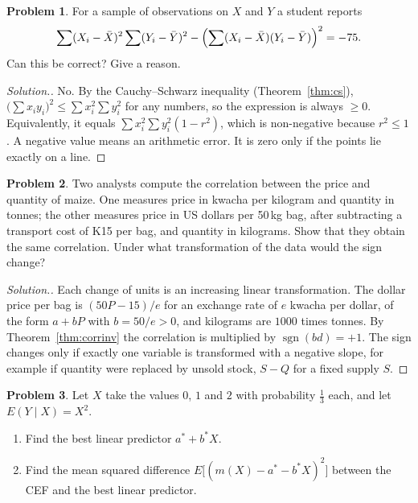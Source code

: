 \documentclass[11pt,a4paper]{article}
\numberwithin{equation}{section}
\theoremstyle{definition}
\newtheorem{problemx}{Problem}[subsection]
\newenvironment{problem}{\begin{problemx}}{\end{problemx}}
\newenvironment{solution}
  {\renewcommand{\qedsymbol}{}\begin{proof}[\textit{Solution}.]}
  {\end{proof}}
\begin{document}
\begin{problem}
\label{prob:minus75}
For a sample of observations on $X$ and $Y$ a student reports
\[
\sum (X_i - \bar X)^2 \sum (Y_i - \bar Y)^2 - \Bigl(\sum (X_i - \bar X)(Y_i - \bar Y)\Bigr)^2 = -75 .
\]
Can this be correct? Give a reason.
\end{problem}

\begin{solution}
No. By the Cauchy--Schwarz inequality (Theorem~\ref{thm:cs}), $\bigl(\sum x_i y_i\bigr)^2 \leq \sum x_i^2 \sum y_i^2$ for any numbers, so the expression
is always $\geq 0$. Equivalently, it equals $\sum x_i^2 \sum y_i^2 (1 - r^2)$, which is non-negative because $r^2 \leq 1$. A negative value means an
arithmetic error. It is zero only if the points lie exactly on a line.
\end{solution}

\begin{problem}
Two analysts compute the correlation between the price and quantity of maize. One measures price in kwacha per kilogram and quantity in
tonnes; the other measures price in US dollars per 50\,kg bag, after subtracting a transport cost of K15 per bag, and quantity in kilograms. Show that
they obtain the same correlation. Under what transformation of the data would the sign change?
\end{problem}

\begin{solution}
Each change of units is an increasing linear transformation. The dollar price per bag is $(50P - 15)/e$ for an exchange rate of $e$ kwacha
per dollar, of the form $a + bP$ with $b = 50/e > 0$, and kilograms are $1000$ times tonnes. By Theorem~\ref{thm:corrinv}
the correlation is multiplied by $\operatorname{sgn}(bd) = +1$. The sign changes only if exactly one variable is transformed with a negative
slope, for example if quantity were replaced by unsold stock, $S - Q$ for a fixed supply $S$.
\end{solution}

\begin{problem}
Let $X$ take the values $0$, $1$ and $2$ with probability $\frac13$ each, and let $E(Y \mid X) = X^2$.
\begin{enumerate}[label=(\alph*)]
\item Find the best linear predictor $a^* + b^* X$.
\item Find the mean squared difference $E\bigl[(m(X) - a^* - b^* X)^2\bigr]$ between the CEF and the best linear predictor.
\end{enumerate}
\end{problem}
\end{document}
